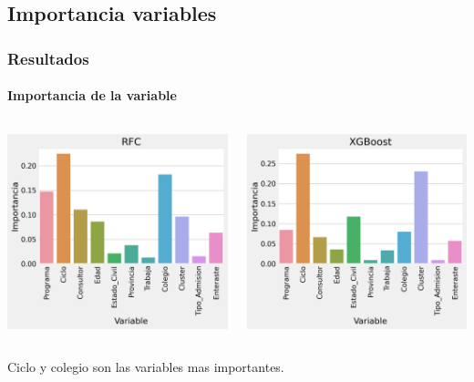 \documentclass[aspectratio=149]{beamer}
\begin{document}
\subsection{Importancia variables}
\begin{frame}
	\frametitle{Resultados}
	\framesubtitle{Importancia de la variable}
	\begin{columns}
		\begin{column}{0.50\textwidth}
			\centering
			\includegraphics[width=\textwidth]{rfc-importancia.png} \\

		\end{column}
		\begin{column}{0.50\textwidth}
			\centering
			\includegraphics[width=\textwidth]{xgb-importancia.png} \\

		\end{column}
	\end{columns}
	\vspace{0.3cm}
	Ciclo y colegio son las variables mas importantes.
\end{frame}
\end{document}
